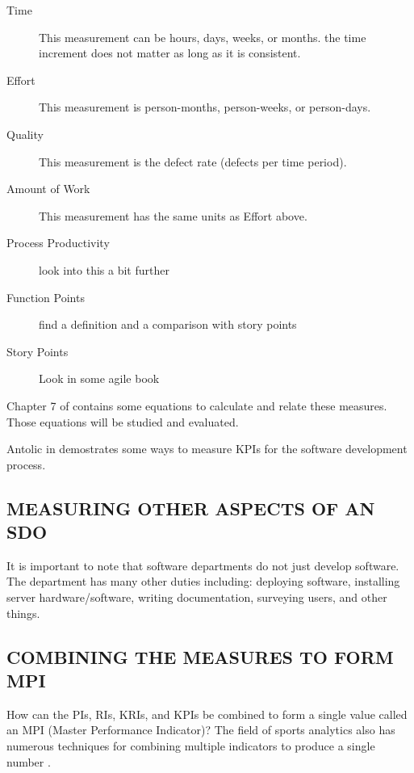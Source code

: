 \documentclass[SDSUThesis.tex]{subfiles}
\begin{document}
\begin{description}
  \item[Time] This measurement can be hours, days, weeks, or months.  the time increment does not matter as long as it is consistent.
  \item[Effort] This measurement is person-months, person-weeks, or person-days.
  \item[Quality] This measurement is the defect rate (defects per time period).
  \item[Amount of Work] This measurement has the same units as Effort above. 
  \item[Process Productivity] look into this a bit further
  \item[Function Points] find a definition and a comparison with story points
  \item[Story Points] Look in some agile book
\end{description}

Chapter 7 of \cite{Putnam2013} contains some equations to calculate and relate
these measures. Those equations will be studied and evaluated.

Antolic in \cite{Antolic2008} demostrates some ways to measure KPIs for the  software development process.

\subsection{MEASURING OTHER ASPECTS OF AN SDO}

It is important to note that software departments do not just
develop software.  The department has many other duties
including: deploying software, installing server hardware/software,
writing documentation, surveying users, and other things.

\subsection{COMBINING THE MEASURES TO FORM MPI}

How can the PIs, RIs, KRIs, and KPIs be combined to form a single
value called an MPI (Master Performance Indicator)?  The field
of sports analytics also has numerous techniques for combining
multiple indicators to produce a single number \cite{Cervone2014}.
\end{document}
